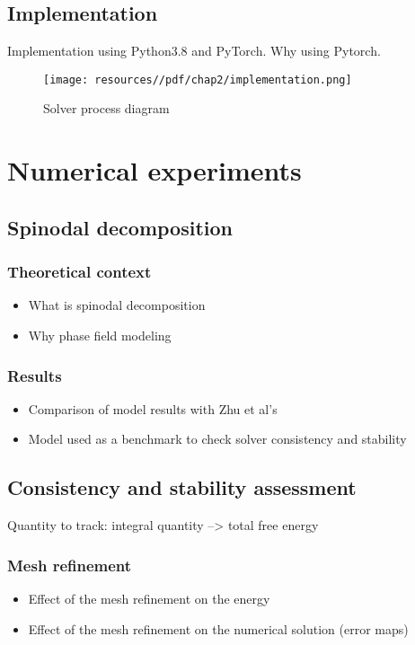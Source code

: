     \subsection{Implementation}
    Implementation using Python3.8 and PyTorch. Why using Pytorch.
        \begin{figure}[H]
            \centering
            \texttt{[image: resources//pdf/chap2/implementation.png]}
            \caption{Solver process diagram}
            \label{fig:enter-label}
        \end{figure}
\section{Numerical experiments}
    \subsection{Spinodal decomposition}
        \subsubsection{Theoretical context}
        \begin{itemize}
            \item What is spinodal decomposition
            \item Why phase field modeling
        \end{itemize}
        \subsubsection{Results}
        \begin{itemize}
            \item Comparison of model results with Zhu et al's
            \item Model used as a benchmark to check solver consistency and stability
        \end{itemize}
    \subsection{Consistency and stability assessment}
        Quantity to track: integral quantity --> total free energy
        \subsubsection{Mesh refinement}
        \begin{itemize}
            \item Effect of the mesh refinement on the energy
            \item Effect of the mesh refinement on the numerical solution (error maps)
        \end{itemize}
